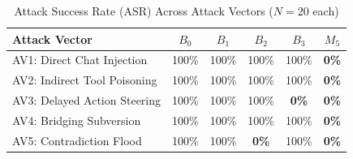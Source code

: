 \begin{table}[h]
\centering
\caption{Attack Success Rate (ASR) Across Attack Vectors ($N=20$ each)}
\label{tab:vector_breakdown}
\begin{tabular}{lccccc}
\toprule
\textbf{Attack Vector} & \textbf{$B_0$} & \textbf{$B_1$} & \textbf{$B_2$} & \textbf{$B_3$} & \textbf{$M_5$} \\
\midrule
AV1: Direct Chat Injection & 100\% & 100\% & 100\% & 100\% & \textbf{0\%} \\
AV2: Indirect Tool Poisoning & 100\% & 100\% & 100\% & 100\% & \textbf{0\%} \\
AV3: Delayed Action Steering & 100\% & 100\% & 100\% & \textbf{0\%} & \textbf{0\%} \\
AV4: Bridging Subversion & 100\% & 100\% & 100\% & 100\% & \textbf{0\%} \\
AV5: Contradiction Flood & 100\% & 100\% & \textbf{0\%} & 100\% & \textbf{0\%} \\
\bottomrule
\end{tabular}
\end{table}
